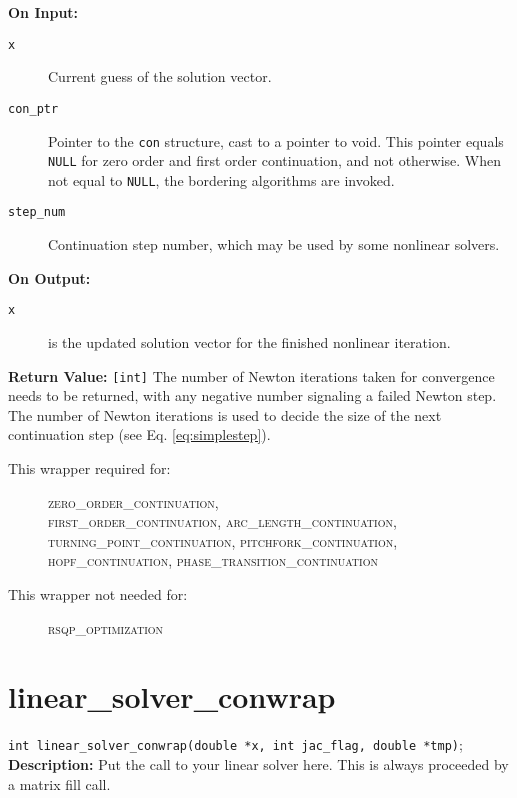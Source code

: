 {\bf On Input:}
\begin{description}
\item[\texttt{x}] Current guess of the solution vector.
\item[\texttt{con\_ptr}] Pointer to the \texttt{con} structure, cast to a pointer to void. This pointer equals \texttt{NULL} for zero order and first order continuation, and not otherwise. When not equal to \texttt{NULL}, the bordering algorithms are invoked.
\item[\texttt{step\_num}] Continuation step number, which may be used by some nonlinear solvers.
\end{description}

{\bf On Output:}
\begin{description}
\item[\texttt{x}] is the updated solution vector for the finished nonlinear iteration.
\end{description}

{\bf Return Value:} \texttt{[int]}
The number of Newton iterations taken for convergence needs to be returned, with any negative number signaling a failed Newton step. The number of Newton iterations is used to decide the size of the next continuation step (see Eq. \ref{eq:simplestep}).

\begin{description}
\item[This wrapper required for:] 
\textsc{zero\_order\_continuation, \\ first\_order\_continuation, arc\_length\_continuation, \\ turning\_point\_continuation, pitchfork\_continuation, \\
hopf\_continuation, phase\_transition\_continuation \\
}
\item[This wrapper not needed for:]
\textsc{rsqp\_optimization}
\end{description}
\section{linear\_solver\_conwrap}
\texttt{int linear\_solver\_conwrap(double *x, int jac\_flag, double *tmp)}; \\

{\bf Description:} Put the call to your linear solver here. This is always proceeded by a matrix fill call. \\

